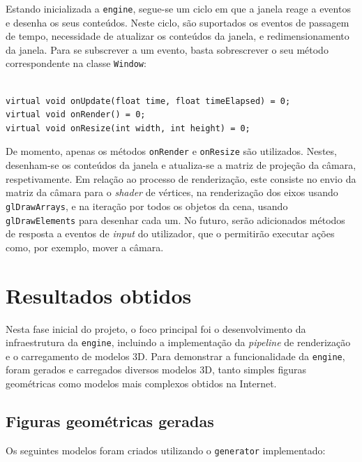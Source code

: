 \documentclass[12pt, a4paper]{article}
\begin{document}
Estando inicializada a \texttt{engine}, segue-se um ciclo em que a janela reage a eventos e desenha
os seus conteúdos. Neste ciclo, são suportados os eventos de passagem de tempo, necessidade de
atualizar os conteúdos da janela, e redimensionamento da janela. Para se subscrever a um evento,
basta sobrescrever o seu método correspondente na classe \texttt{Window}:

\lstset{language=c++}
\begin{lstlisting}

virtual void onUpdate(float time, float timeElapsed) = 0;
virtual void onRender() = 0;
virtual void onResize(int width, int height) = 0;
\end{lstlisting}

De momento, apenas os métodos \texttt{onRender} e \texttt{onResize} são utilizados. Nestes,
desenham-se os conteúdos da janela e atualiza-se a matriz de projeção da câmara, respetivamente. Em
relação ao processo de renderização, este consiste no envio da matriz da câmara para o \emph{shader}
de vértices, na renderização dos eixos usando \texttt{glDrawArrays}, e na iteração por todos os
objetos da cena, usando \texttt{glDrawElements} para desenhar cada um. No futuro, serão adicionados
métodos de resposta a eventos de \emph{input} do utilizador, que o permitirão executar ações como,
por exemplo, mover a câmara.

\section{Resultados obtidos}

Nesta fase inicial do projeto, o foco principal foi o desenvolvimento da infraestrutura da
\texttt{engine}, incluindo a implementação da \emph{pipeline} de renderização e o carregamento de
modelos 3D. Para demonstrar a funcionalidade da \texttt{engine}, foram gerados e carregados diversos
modelos 3D, tanto simples figuras geométricas como modelos mais complexos obtidos na Internet.

\subsection{Figuras geométricas geradas}

Os seguintes modelos foram criados utilizando o \texttt{generator} implementado:
\end{document}
